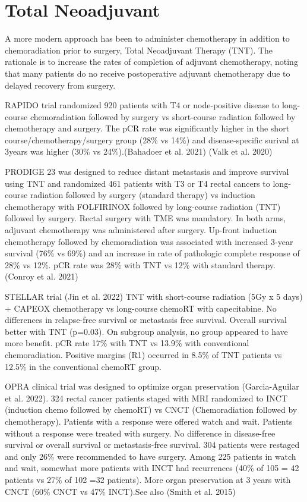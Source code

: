 \documentclass[
  letterpaper,
]{scrbook}
\begin{document}
\section{Total Neoadjuvant}\label{total-neoadjuvant}

A more modern approach has been to administer chemotherapy in addition
to chemoradiation prior to surgery, Total Neoadjuvant Therapy (TNT). The
rationale is to increase the rates of completion of adjuvant
chemotherapy, noting that many patients do no receive postoperative
adjuvant chemotherapy due to delayed recovery from surgery.

RAPIDO trial randomized 920 patients with T4 or node-positive disease to
long-course chemoradiation followed by surgery vs short-course radiation
followed by chemotherapy and surgery. The pCR rate was significantly
higher in the short course/chemotherapy/surgery group (28\% vs 14\%) and
disease-specific surival at 3years was higher (30\% vs 24\%).(Bahadoer
et al. 2021) (Valk et al. 2020)

PRODIGE 23 was designed to reduce distant metastasis and improve
survival using TNT and randomized 461 patients with T3 or T4 rectal
cancers to long-course radiation followed by surgery (standard therapy)
vs induction chemotherapy with FOLFIRINOX followed by long-course
radiation (TNT) followed by surgery. Rectal surgery with TME was
mandatory. In both arms, adjuvant chemotherapy was administered after
surgery. Up-front induction chemotherapy followed by chemoradiation was
associated with increased 3-year survival (76\% vs 69\%) and an increase
in rate of pathologic complete response of 28\% vs 12\%. pCR rate was
28\% with TNT vs 12\% with standard therapy. (Conroy et al. 2021)

STELLAR trial (Jin et al. 2022) TNT with short-course radiation (5Gy x 5
days) + CAPEOX chemotherapy vs long-course chemoRT with capecitabine. No
differences in relapse-free survival or metastasis free survival.
Overall survival better with TNT (p=0.03). On subgroup analysis, no
group appeared to have more benefit. pCR rate 17\% with TNT vs 13.9\%
with conventional chemoradiation. Positive margins (R1) occurred in
8.5\% of TNT patients vs 12.5\% in the conventional chemoRT group.

OPRA clinical trial was designed to optimize organ preservation
(Garcia-Aguilar et al. 2022). 324 rectal cancer patients staged with MRI
randomized to INCT (induction chemo followed by chemoRT) vs CNCT
(Chemoradiation followed by chemotherapy). Patients with a response were
offered watch and wait. Patients without a response were treated with
surgery. No difference in disease-free survival or overall survival or
metastasis-free survival. 304 patients were restaged and only 26\% were
recommended to have surgery. Among 225 patients in watch and wait,
somewhat more patients with INCT had recurrences (40\% of 105 = 42
patients vs 27\% of 102 =32 patients). More organ preservation at 3
years with CNCT (60\% CNCT vs 47\% INCT).See also (Smith et al. 2015)
\end{document}
